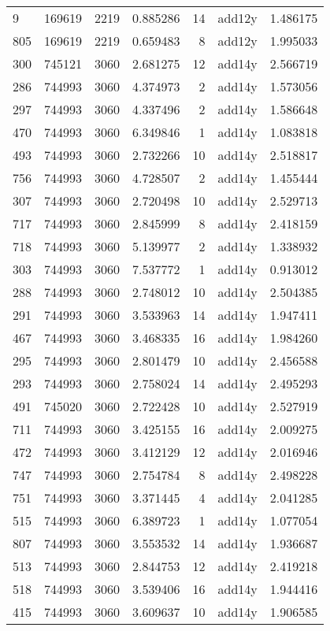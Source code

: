 \begin{tabular}{lrrrrlr}
9 & 169619 & 2219 & 0.885286 & 14 & add12y & 1.486175 \\
805 & 169619 & 2219 & 0.659483 & 8 & add12y & 1.995033 \\
300 & 745121 & 3060 & 2.681275 & 12 & add14y & 2.566719 \\
286 & 744993 & 3060 & 4.374973 & 2 & add14y & 1.573056 \\
297 & 744993 & 3060 & 4.337496 & 2 & add14y & 1.586648 \\
470 & 744993 & 3060 & 6.349846 & 1 & add14y & 1.083818 \\
493 & 744993 & 3060 & 2.732266 & 10 & add14y & 2.518817 \\
756 & 744993 & 3060 & 4.728507 & 2 & add14y & 1.455444 \\
307 & 744993 & 3060 & 2.720498 & 10 & add14y & 2.529713 \\
717 & 744993 & 3060 & 2.845999 & 8 & add14y & 2.418159 \\
718 & 744993 & 3060 & 5.139977 & 2 & add14y & 1.338932 \\
303 & 744993 & 3060 & 7.537772 & 1 & add14y & 0.913012 \\
288 & 744993 & 3060 & 2.748012 & 10 & add14y & 2.504385 \\
291 & 744993 & 3060 & 3.533963 & 14 & add14y & 1.947411 \\
467 & 744993 & 3060 & 3.468335 & 16 & add14y & 1.984260 \\
295 & 744993 & 3060 & 2.801479 & 10 & add14y & 2.456588 \\
293 & 744993 & 3060 & 2.758024 & 14 & add14y & 2.495293 \\
491 & 745020 & 3060 & 2.722428 & 10 & add14y & 2.527919 \\
711 & 744993 & 3060 & 3.425155 & 16 & add14y & 2.009275 \\
472 & 744993 & 3060 & 3.412129 & 12 & add14y & 2.016946 \\
747 & 744993 & 3060 & 2.754784 & 8 & add14y & 2.498228 \\
751 & 744993 & 3060 & 3.371445 & 4 & add14y & 2.041285 \\
515 & 744993 & 3060 & 6.389723 & 1 & add14y & 1.077054 \\
807 & 744993 & 3060 & 3.553532 & 14 & add14y & 1.936687 \\
513 & 744993 & 3060 & 2.844753 & 12 & add14y & 2.419218 \\
518 & 744993 & 3060 & 3.539406 & 16 & add14y & 1.944416 \\
415 & 744993 & 3060 & 3.609637 & 10 & add14y & 1.906585 \\

\end{tabular}
